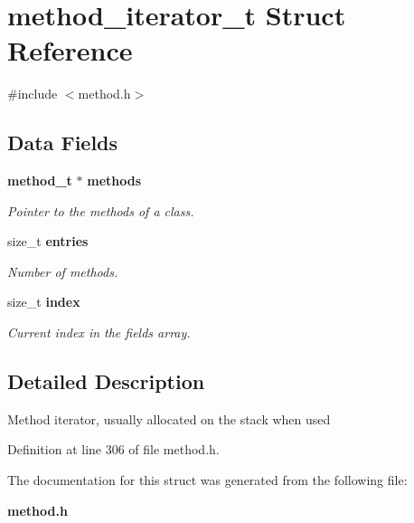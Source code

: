 \section{method\_\-iterator\_\-t Struct Reference}
\label{structmethod__iterator__t}


{\ttfamily \#include $<$method.h$>$}

\subsection*{Data Fields}
\begin{DoxyCompactItemize}
\item 
{\bf method\_\-t} $\ast$ {\bf methods}\label{structmethod__iterator__t_a876eccfde37cd2a9a32e8bb81fa974eb}

\begin{DoxyCompactList}\small\item\em Pointer to the methods of a class. \item\end{DoxyCompactList}\item 
size\_\-t {\bf entries}\label{structmethod__iterator__t_aa811df1a0b12333d92c5a7fa52689f79}

\begin{DoxyCompactList}\small\item\em Number of methods. \item\end{DoxyCompactList}\item 
size\_\-t {\bf index}\label{structmethod__iterator__t_aba923715c4632137fccd428798a8d691}

\begin{DoxyCompactList}\small\item\em Current index in the fields array. \item\end{DoxyCompactList}\end{DoxyCompactItemize}


\subsection{Detailed Description}
Method iterator, usually allocated on the stack when used 

Definition at line 306 of file method.h.



The documentation for this struct was generated from the following file:\begin{DoxyCompactItemize}
\item 
{\bf method.h}\end{DoxyCompactItemize}
